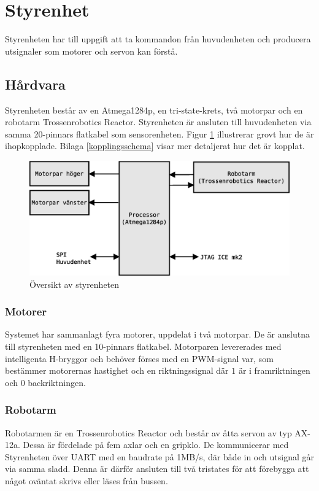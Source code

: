
\section{Styrenhet}

Styrenheten har till uppgift att ta kommandon från huvudenheten och producera utsignaler som motorer och servon kan förstå.

\subsection{Hårdvara}
Styrenheten består av en Atmega1284p, en tri-state-krets\cite{tristate}, två motorpar och en robotarm Trossenrobotics Reactor\cite{robotarm}. Styrenheten är ansluten till huvudenheten via samma 20-pinnars flatkabel som sensorenheten. Figur \ref{styr-oversikt} illustrerar grovt hur de är ihopkopplade. Bilaga \ref{kopplingsschema} visar mer detaljerat hur det är kopplat.

\begin{figure}[h!]
	\centering
	\includegraphics[scale=0.4]{grafik/styrenhet-oversikt}
	\caption{Översikt av styrenheten} \label{styr-oversikt}
\end{figure}

\subsubsection{Motorer}
Systemet har sammanlagt fyra motorer, uppdelat i två motorpar. De är anslutna till styrenheten med en 10-pinnars flatkabel. Motorparen levererades med intelligenta H-bryggor\cite{pwmmotor} och behöver förses med en PWM-signal var, som bestämmer motorernas hastighet och en riktningssignal där $1$ är i framriktningen och $0$ backriktningen.

\subsubsection{Robotarm}
Robotarmen är en Trossenrobotics Reactor och består av åtta servon av typ AX-12a\cite{servo}. Dessa är fördelade på fem axlar och en gripklo. De kommunicerar med Styrenheten över UART med en baudrate på 1MB/s, där både in och utsignal går via samma sladd. Denna är därför ansluten till två tristates för att förebygga att något oväntat skrivs eller läses från bussen.

